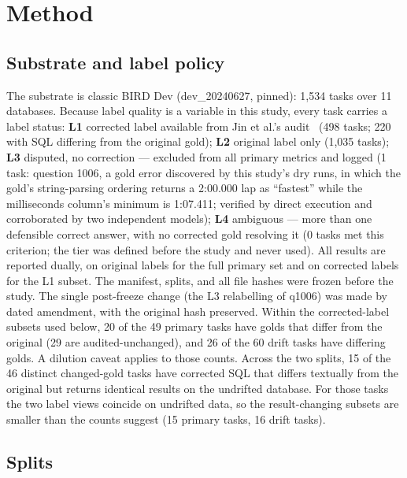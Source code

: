 \documentclass[sigconf, nonacm]{acmart}
\begin{document}
\section{Method}

\subsection{Substrate and label policy}

The substrate is classic BIRD Dev (dev\_20240627, pinned): 1,534 tasks over 11 databases. Because label quality is a variable in this study, every task carries a label status: \textbf{L1} corrected label available from Jin et al.'s audit~\cite{jin} (498 tasks; 220 with SQL differing from the original gold); \textbf{L2} original label only (1,035 tasks); \textbf{L3} disputed, no correction --- excluded from all primary metrics and logged (1 task: question 1006, a gold error discovered by this study's dry runs, in which the gold's string-parsing ordering returns a 2:00.000 lap as ``fastest'' while the milliseconds column's minimum is 1:07.411; verified by direct execution and corroborated by two independent models); \textbf{L4} ambiguous --- more than one defensible correct answer, with no corrected gold resolving it (0 tasks met this criterion; the tier was defined before the study and never used). All results are reported dually, on original labels for the full primary set and on corrected labels for the L1 subset. The manifest, splits, and all file hashes were frozen before the study. The single post-freeze change (the L3 relabelling of q1006) was made by dated amendment, with the original hash preserved. Within the corrected-label subsets used below, 20 of the 49 primary tasks have golds that differ from the original (29 are audited-unchanged), and 26 of the 60 drift tasks have differing golds. A dilution caveat applies to those counts. Across the two splits, 15 of the 46 distinct changed-gold tasks have corrected SQL that differs textually from the original but returns identical results on the undrifted database. For those tasks the two label views coincide on undrifted data, so the result-changing subsets are smaller than the counts suggest (15 primary tasks, 16 drift tasks).

\subsection{Splits}
\end{document}
